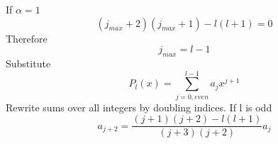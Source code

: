 \documentclass[12pt]{article}
\begin{document}
    If $\alpha = 1$
    \begin{equation} \label{eq: 2.18}
        (j_{max} + 2)(j_{max} + 1) - l(l+1) =0
    \end{equation} 
    Therefore
    \begin{equation} \label{eq: 2.19}
        j_{max}=l-1
    \end{equation} 
    Substitute 
    \begin{equation} \label{eq: 2.20}
        P_l(x) = \sum_{j=0,even}^{l-1} a_j x^{j+1}
    \end{equation} 
    Rewrite sums over all integers by doubling indices. If l is odd
    \begin{equation} \label{eq: 2.21}
        a_{j+2} = \frac{(j+1) (j+2) - l(l+1)}{(j + 3) (j + 2)} a_j
    \end{equation}     
\end{document}
